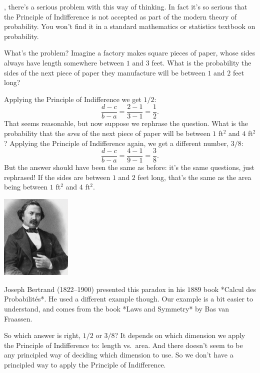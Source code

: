 \documentclass[justified]{tufte-book}
\theoremstyle{definition}
\theoremstyle{definition}
\theoremstyle{definition}
\theoremstyle{remark}
\begin{document}
, there's a serious problem with this way of
thinking. In fact it's so serious that the Principle of Indifference is
not accepted as part of the modern theory of probability. You won't find
it in a standard mathematics or statistics textbook on probability.

What's the problem? Imagine a factory makes square pieces of paper,
whose sides always have length somewhere between \(1\) and \(3\) feet.
What is the probability the sides of the next piece of paper they
manufacture will be between \(1\) and \(2\) feet long?

Applying the Principle of Indifference we get \(1/2\):
\[ \frac{d-c}{b-a} = \frac{2-1}{3-1} = \frac{1}{2}. \] That seems
reasonable, but now suppose we rephrase the question. What is the
probability that the \emph{area} of the next piece of paper will be
between \(1\) ft\(^2\) and \(4\) ft\(^2\)? Applying the Principle of
Indifference again, we get a different number, \(3/8\):
\[ \frac{d-c}{b-a} = \frac{4-1}{9-1} = \frac{3}{8}. \] But the answer
should have been the same as before: it's the same questions, just
rephrased! If the sides are between \(1\) and \(2\) feet long, that's
the same as the area being between \(1\) ft\(^2\) and \(4\) ft\(^2\).

\begin{marginfigure}
\includegraphics[width=1.33in]{img/bertrand} \caption[Joseph Bertrand (1822--1900) presented this paradox in his $1889$ book *Calcul des Probabilités*]{Joseph Bertrand (1822--1900) presented this paradox in his $1889$ book *Calcul des Probabilités*. He used a different example though. Our example is a bit easier to understand, and comes from the book *Laws and Symmetry* by Bas van Fraassen.}\label{fig:unnamed-chunk-133}
\end{marginfigure}

So which answer is right, \(1/2\) or \(3/8\)? It depends on which
dimension we apply the Principle of Indifference to: length vs.~area.
And there doesn't seem to be any principled way of deciding which
dimension to use. So we don't have a principled way to apply the
Principle of Indifference.
\end{document}

